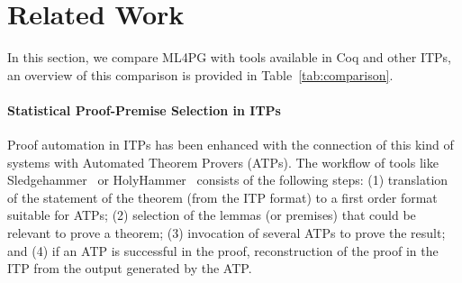 \section{Related Work}\label{sec:relatedwork}

In this section, we compare ML4PG with tools available in Coq and other ITPs, an overview of this comparison is provided in
Table~\ref{tab:comparison}.

\begin{table}
\end{table}


\paragraph{Statistical Proof-Premise Selection in ITPs} Proof automation in ITPs has been enhanced with the connection of this kind of
systems with Automated Theorem Provers (ATPs). The workflow of tools like Sledgehammer~\cite{Paulson_threeyears} or HolyHammer~\cite{holyhammer} consists of the following steps: (1) translation of the statement of the theorem (from the ITP format) to a
first order format suitable for ATPs; (2) selection of the lemmas (or premises) that could be relevant to prove a theorem;
(3) invocation of several ATPs to prove the result; and (4) if an ATP is successful in the proof, reconstruction of the proof in
the ITP from the output generated by the ATP.

